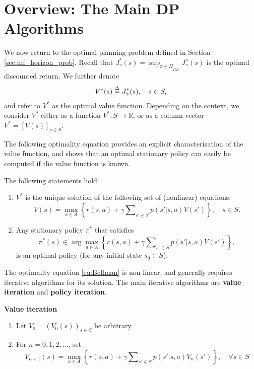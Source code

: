 \section{Overview: The Main DP Algorithms}

We now return to the optimal planning problem defined in Section \ref{sec:inf_horizon_prob}. Recall that  $J_\gamma ^*(s) = {\sup _{\pi  \in \Pi }}_{_{GR}}J_\gamma ^\pi (s)$ is the optimal discounted return. We further denote
\[{V^*}(s) \buildrel \Delta \over = J_\gamma ^*(s),    \quad s \in S,\]
and refer to ${V^*}$ as the optimal value function. Depending on the context, we consider ${V^*}$ either as a function $V^* : S \to \mathbb R$, or as a column vector ${V^*} = {[V(s)]_{s \in S}}$.

The following optimality equation provides an explicit characterization of the value function, and shows that an optimal stationary policy can easily be computed if the value function is known.

\begin{theorem}\label{thm:inf_Bellman} The following statements hold:
\begin{enumerate}
  \item $V_{}^*$ is the unique solution of the following set of (nonlinear) equations:
\begin{equation}\label{eq:Bellman}
V(s) = \mathop {\max }\limits_{a \in A} \left\{ {r(s,a) + \gamma \sum\nolimits_{s' \in S} {p(s'|s,a)V(s')} } \right\},     \quad s \in S.
\end{equation}
  \item Any stationary policy ${\pi ^*}$ that satisfies
\[{\pi ^*}(s) \in \arg {\max _{a \in A}}\left\{ {r(s,a) + \gamma \sum\nolimits_{s' \in S} {p(s'|s,a)V(s')} } \right\},\]
     is an optimal policy (for any initial state ${s_0} \in S$).
\end{enumerate}
\end{theorem}
The optimality equation \eqref{eq:Bellman} is non-linear, and generally requires iterative algorithms for its solution. The main iterative algorithms are \textbf{value iteration} and \textbf{policy iteration}.

\begin{algorithm_}\textbf{Value iteration}\label{alg:VI}
\begin{enumerate}
  \item Let ${V_0} = {({V_0}(s))_{s \in S}}$ be arbitrary.
  \item For $n = 0,1,2, \ldots $, set
\[{V_{n + 1}}(s) = \mathop {\max }\limits_{a \in A} \left\{ {r(s,a) + \gamma \sum\nolimits_{s' \in S} {p(s'|s,a){V_n}(s')} } \right\},    \quad \forall s \in S\]
\end{enumerate}
\end{algorithm_}

